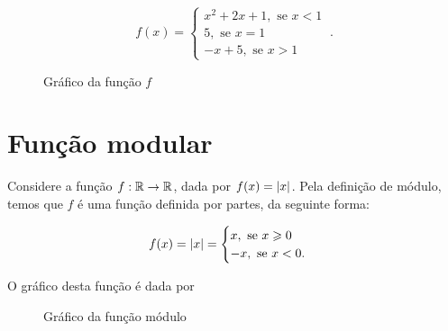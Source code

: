 \begin{exem}
\begin{equation*}
f(x) = \begin{cases}
                 x^2+2x+1, \text{ se } x < 1 \\
                 5, \text{ se } x = 1 \\
                -x+5, \text{ se } x > 1
                \end{cases} \ .
\end{equation*}
\begin{figure}[H]
  \centering
   \caption{Gráfico da função $f$}
  \end{figure}
\end{exem}

\section{Função modular}

  Considere a função $f: \mathbb{R} \rightarrow \mathbb{R}$, dada por $f(x)= \left|x\right|$. Pela definição de módulo, temos que $f$ é uma função definida por partes, da seguinte forma:

  \[f(x)= \left|x\right| = \begin{cases}
                 x, \text{ se } x \geqslant 0 \\
                 -x, \text{ se } x < 0.
                \end{cases}\]

O gráfico desta função é dada por

  \begin{figure}[H]
 \centering
    \caption{Gráfico da função módulo}
  \end{figure}

